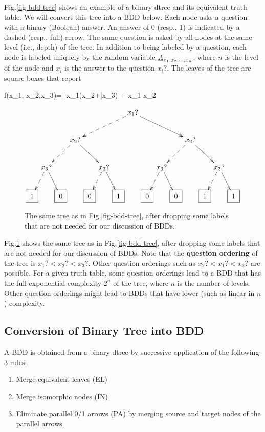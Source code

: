 Fig.\ref{fig-bdd-tree} shows an
example of a binary dtree and its
equivalent truth table.
We will  convert this tree
 into a BDD below. Each node asks a question with a binary (Boolean) answer. An answer of 0 (resp., 1) is indicated by a dashed (resp., full) arrow. The same question is asked by all nodes at the same level (i.e., depth) of the tree. In addition to being labeled by a question, each node is labeled uniquely by the random variable $\rvA_{x_1, x_2, \ldots, x_n}$,
where $n$ is the level of the node
and $x_i$ is the answer to the question $x_i?$.
The leaves of
the tree are square boxes that report

\beq
f(x_1, x_2,x_3)=
\bar{x}_1(x_2+\bar{x}_3)  + x_1 x_2
\label{eq-bdd-truth-table}
\eeq
\begin{figure}[h!]
$$
\xymatrix@C=.1pc{
&&&&&&&x_1?\ar@{-->}[dllll]
\ar[drrrr]
\\
&&&x_2?\ar@{-->}[dll]\ar[drr]
&&&&&&&&x_2?\ar@{-->}[dll]\ar[drr]
\\
&x_3?\ar@{-->}[dl]\ar[dr]
&&&&x_3?\ar@{-->}[dl]\ar[dr]
&&&&x_3?\ar@{-->}[dl]\ar[dr]
&&&&x_3?\ar@{-->}[dl]\ar[dr]
\\
\Rect{1}
&&\Rect{0}
&&\Rect{0}
&&\Rect{1}
&&\Rect{0}
&&\Rect{0}
&&\Rect{1}
&&\Rect{1}
}
$$
\caption{The same tree as in Fig.\ref{fig-bdd-tree}, after dropping
some labels that are not needed
for our discussion of BDDs.}
\label{fig-bdd-tree-simp}
\end{figure}


Fig.\ref{fig-bdd-tree-simp} shows
the same tree as in  Fig.\ref{fig-bdd-tree}, after dropping
some labels that are not needed
for our discussion of BDDs.
Note that the {\bf question ordering} of the tree is
$x_1?<x_2?<x_3?$. Other question
orderings such as $x_2?< x_1? < x_3?$
are possible. For a given
truth table, some question
orderings lead to a BDD
that has the full
exponential complexity $2^n$
of the tree, where $n$ is
the number of levels. Other question orderings
might lead to BDDs that have lower (such as linear in $n$)
complexity.



\subsection{Conversion of Binary Tree into BDD}

A BDD is obtained
from a binary dtree by
successive application of the
following
3 rules:

\begin{enumerate}
\item Merge equivalent leaves (EL)
\item Merge isomorphic nodes (IN)
\item Eliminate parallel 0/1 arrows (PA) by merging source
and target nodes of the parallel  arrows.
\end{enumerate}

